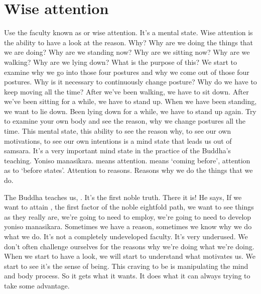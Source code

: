 \documentclass[letterpaper,10pt,english]{sphinxmanual}
\begin{document}
\section{Wise attention}
\label{\detokenize{1-b:wise-attention}}
\sphinxAtStartPar
Use the faculty known as
or wise attention. It’s a
mental state. Wise attention is the ability to have a look at the reason. Why?
Why are we doing the things that we are doing? Why are we standing now?
Why are we sitting now? Why are we walking? Why are we lying down?
What is the purpose of this? We start to examine why we go into those four
postures and why we come out of those four postures. Why is it necessary
to  continuously  change  posture? Why  do  we  have  to  keep  moving  all  the
time? After  we’ve  been  walking,  we  have  to  sit  down. After  we’ve  been
sitting for a while, we have to stand up. When we have been standing, we
want to lie down. Been lying down for a while, we have to stand up again.
Try to examine your own body and see the reason, why we change postures
all the time. This mental state, this ability to see the reason why, to see our
own motivations, to see our own intentions is a mind state that leads us out
of samsara. It’s a very important mind state in the practice of the Buddha’s
teaching.  Yoniso  manasikara.
means  attention.
means
‘coming before’, attention as to ‘before states’. Attention to reasons. Reasons why we do the things that we do.

\sphinxAtStartPar
The Buddha teaches us,
. It’s the first noble truth.
There it is! He says,
If we want to attain
, the first factor
of the noble eightfold path, we want to see things as they really are, we’re
going to need to employ, we’re going to need to develop yoniso manasikara.
  Sometimes we have a reason, sometimes we know why we do what we do.
It’s  not  a  completely  undeveloped  faculty.  It’s  very  under\sphinxhyphen{}used.  We  don’t
often challenge ourselves for the reasons why we’re doing what we’re doing.
When we start to have a look, we will start to understand what motivates us.
We start to see it’s the sense of being. This craving to be is manipulating the
mind and body process. So it gets what it wants. It does what it can always
trying to take some advantage.
\end{document}

